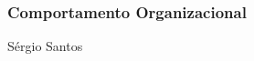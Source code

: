 \begin{frame}
\frametitle{Comportamento Organizacional}
\vfill
\hfill {\tiny Sérgio Santos}
\end{frame}

